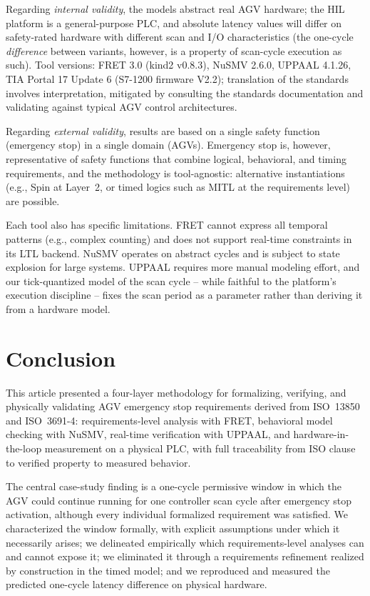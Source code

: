 \documentclass{ieeeaccess}
\theoremstyle{definition}
\begin{document}
Regarding \emph{internal validity}, the models abstract real AGV hardware; the HIL platform is a general-purpose PLC, and absolute latency values will differ on safety-rated hardware with different scan and I/O characteristics (the one-cycle \emph{difference} between variants, however, is a property of scan-cycle execution as such). Tool versions: FRET 3.0 (kind2 v0.8.3), NuSMV 2.6.0, UPPAAL 4.1.26, TIA Portal 17 Update 6 (S7-1200 firmware V2.2); translation of the standards involves interpretation, mitigated by consulting the standards documentation and validating against typical AGV control architectures.

Regarding \emph{external validity}, results are based on a single safety function (emergency stop) in a single domain (AGVs). Emergency stop is, however, representative of safety functions that combine logical, behavioral, and timing requirements, and the methodology is tool-agnostic: alternative instantiations (e.g., Spin at Layer~2, or timed logics such as MITL at the requirements level) are possible.

Each tool also has specific limitations. FRET cannot express all temporal patterns (e.g., complex counting) and does not support real-time constraints in its LTL backend. NuSMV operates on abstract cycles and is subject to state explosion for large systems. UPPAAL requires more manual modeling effort, and our tick-quantized model of the scan cycle -- while faithful to the platform's execution discipline -- fixes the scan period as a parameter rather than deriving it from a hardware model.

\section{Conclusion}
\label{sec:conclusion}

This article presented a four-layer methodology for formalizing, verifying, and physically validating AGV emergency stop requirements derived from ISO~13850 and ISO~3691-4: requirements-level analysis with FRET, behavioral model checking with NuSMV, real-time verification with UPPAAL, and hardware-in-the-loop measurement on a physical PLC, with full traceability from ISO clause to verified property to measured behavior.

The central case-study finding is a one-cycle permissive window in which the AGV could continue running for one controller scan cycle after emergency stop activation, although every individual formalized requirement was satisfied. We characterized the window formally, with explicit assumptions under which it necessarily arises; we delineated empirically which requirements-level analyses can and cannot expose it; we eliminated it through a requirements refinement realized by construction in the timed model; and we reproduced and measured the predicted one-cycle latency difference on physical hardware.
\end{document}
